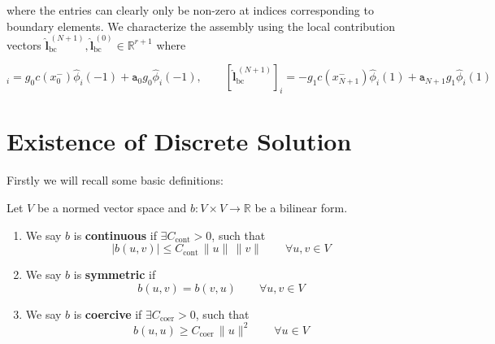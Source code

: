 where the entries can clearly only be non-zero at indices corresponding to
boundary elements.
We characterize the assembly using the local contribution vectors
$\widehat{\textbf{l}}_{\text{bc}}^{\,(N+1)}, \widehat{\textbf{l}}_{\text{bc}}^{\,(0)} \in \mathbb{R}^{r+1}$
where

\begin{equation*}
	[\widehat{\textbf{l}}_{\text{bc}}^{\,(0)}]_{i} = g_0c(x_{0}^-) \widehat{\phi}_i(-1) + \texttt{a}_{0}g_0\widehat{\phi}_i(-1), \qquad
	[\widehat{\textbf{l}}_{\text{bc}}^{\,(N+1)}]_{i} = -g_1c(x_{N+1}^-) \widehat{\phi}_i(1) + \texttt{a}_{N+1}g_1\widehat{\phi}_i(1)
\end{equation*}

\section{Existence of Discrete Solution}
\label{sec:existence_uniqueness_elliptic_discrete_problem}
Firstly we will recall some basic definitions:
\begin{definition} Let $V$ be a normed vector space and $b:V\times V \to \mathbb{R}$
	be a bilinear form.
	\begin{enumerate}[label=\textnormal{(\roman*)}]
		\item We say $b$ is \textbf{continuous} if $\exists C_{\text{cont}}>0$, such that
		      \[
			      |b(u,v)|\leq C_{\text{cont}}\, \|u\|\, \|v\| \qquad \forall u,v \in V
		      \]
		\item We say $b$ is \textbf{symmetric} if
		      \[
			      b(u,v) = b(v,u) \qquad \forall u,v \in V
		      \]
		\item We say $b$ is \textbf{coercive} if $\exists C_{\text{coer}}>0$, such that
		      \[
			      b(u,u)\geq C_{\text{coer}}\, \|u\|^2 \qquad \forall u \in V
		      \]
	\end{enumerate}
\end{definition}


